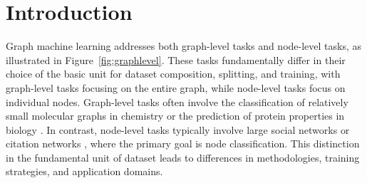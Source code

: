 \vspace{-0.2 in}
\section{Introduction}


Graph machine learning addresses both graph-level tasks and node-level tasks, as illustrated in Figure~\ref{fig:graphlevel}. 
These tasks fundamentally differ in their choice of the basic unit for dataset composition, splitting, and training,
with graph-level tasks focusing on the entire graph, while node-level tasks focus on individual nodes. Graph-level tasks \cite{dwivedi2023benchmarking,hu2020open,luo2023impact,luo2023improving} often involve the classification of relatively small molecular graphs in chemistry \cite{morris2020tudataset} or the prediction of protein properties in biology \cite{dwivedi2022long}. In contrast, node-level tasks typically involve large social networks \cite{tang2009social} or citation networks \cite{yang2016revisiting}, where the primary goal is node classification. This distinction in the fundamental unit of dataset leads to differences in methodologies, training strategies, and application domains.



